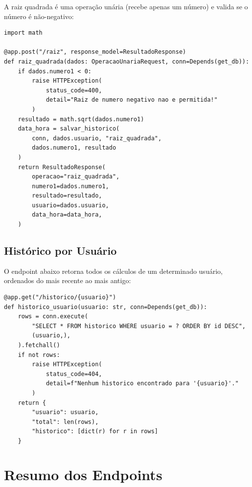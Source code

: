 \documentclass[12pt, a4paper]{article}
\begin{document}
A raiz quadrada é uma operação unária (recebe apenas um número) e valida se o número é não-negativo:

\begin{lstlisting}[caption={Endpoint de raiz quadrada}]
import math

@app.post("/raiz", response_model=ResultadoResponse)
def raiz_quadrada(dados: OperacaoUnariaRequest, conn=Depends(get_db)):
    if dados.numero1 < 0:
        raise HTTPException(
            status_code=400,
            detail="Raiz de numero negativo nao e permitida!"
        )
    resultado = math.sqrt(dados.numero1)
    data_hora = salvar_historico(
        conn, dados.usuario, "raiz_quadrada",
        dados.numero1, resultado
    )
    return ResultadoResponse(
        operacao="raiz_quadrada",
        numero1=dados.numero1,
        resultado=resultado,
        usuario=dados.usuario,
        data_hora=data_hora,
    )
\end{lstlisting}

\subsection{Histórico por Usuário}

O endpoint abaixo retorna todos os cálculos de um determinado usuário, ordenados do mais recente ao mais antigo:

\begin{lstlisting}[caption={Endpoint de histórico por usuário}]
@app.get("/historico/{usuario}")
def historico_usuario(usuario: str, conn=Depends(get_db)):
    rows = conn.execute(
        "SELECT * FROM historico WHERE usuario = ? ORDER BY id DESC",
        (usuario,),
    ).fetchall()
    if not rows:
        raise HTTPException(
            status_code=404,
            detail=f"Nenhum historico encontrado para '{usuario}'."
        )
    return {
        "usuario": usuario,
        "total": len(rows),
        "historico": [dict(r) for r in rows]
    }
\end{lstlisting}

\section{Resumo dos Endpoints}
\end{document}
